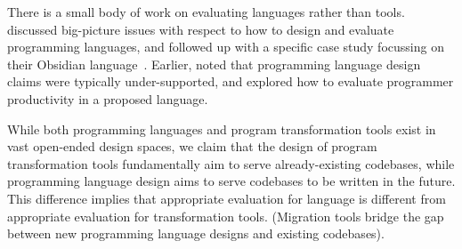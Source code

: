 \begin{center}
\end{center}

There is a small body of work on evaluating languages rather than tools.
discussed big-picture issues with respect to how to design and evaluate programming languages, and followed up with a specific case study focussing on their Obsidian
language~\cite{coblenz20:_can_advan_type_system_be_usabl}.
Earlier,  noted that programming 
language design claims were typically under-supported, and  explored how to evaluate programmer productivity in a
proposed language. 

While both programming languages and program transformation tools exist
in vast open-ended design spaces, we claim that the design of program transformation
tools fundamentally aim to serve already-existing codebases, while programming 
language design aims to serve codebases to be written in the future.
This difference implies that appropriate evaluation for language is different 
from appropriate evaluation for transformation tools.
(Migration tools bridge the gap between new programming language designs
and existing codebases).

